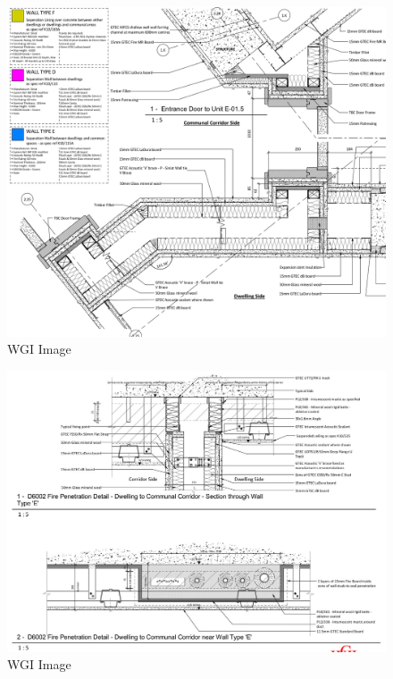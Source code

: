 \documentclass[
]{article}
\begin{document}
\begin{figure}[H]

{\centering \includegraphics{assets/WGI/WGI-6.png}

}

\caption{WGI Image}

\end{figure}%
\begin{figure}[H]

{\centering \includegraphics{assets/WGI/WGI-BSC-details2.jpg}

}

\caption{WGI Image}

\end{figure}%
\end{document}
